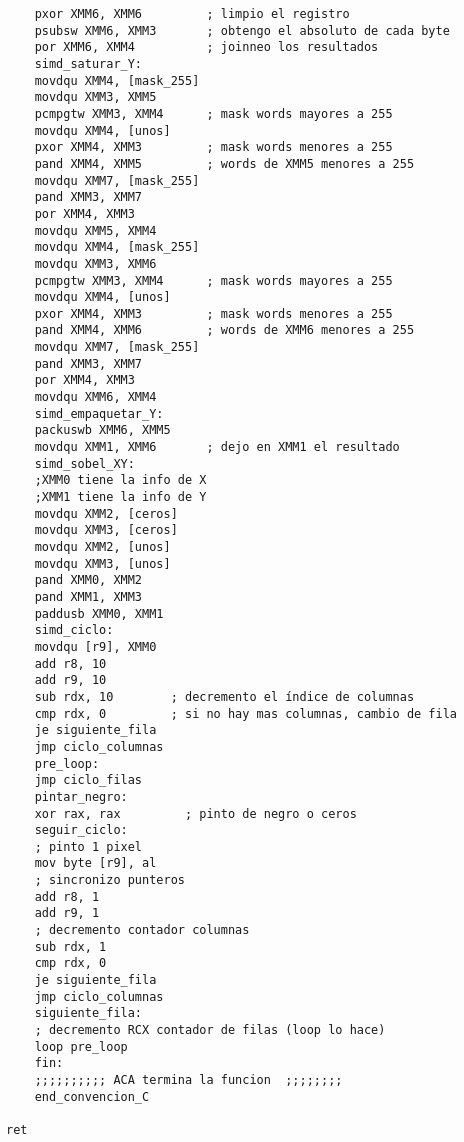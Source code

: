 \begin{verbatim}
    pxor XMM6, XMM6         ; limpio el registro
    psubsw XMM6, XMM3       ; obtengo el absoluto de cada byte
    por XMM6, XMM4          ; joinneo los resultados
    simd_saturar_Y:
    movdqu XMM4, [mask_255]
    movdqu XMM3, XMM5
    pcmpgtw XMM3, XMM4      ; mask words mayores a 255
    movdqu XMM4, [unos]
    pxor XMM4, XMM3         ; mask words menores a 255
    pand XMM4, XMM5         ; words de XMM5 menores a 255
    movdqu XMM7, [mask_255]
    pand XMM3, XMM7
    por XMM4, XMM3
    movdqu XMM5, XMM4
    movdqu XMM4, [mask_255]
    movdqu XMM3, XMM6
    pcmpgtw XMM3, XMM4      ; mask words mayores a 255
    movdqu XMM4, [unos]
    pxor XMM4, XMM3         ; mask words menores a 255
    pand XMM4, XMM6         ; words de XMM6 menores a 255
    movdqu XMM7, [mask_255]
    pand XMM3, XMM7
    por XMM4, XMM3
    movdqu XMM6, XMM4
    simd_empaquetar_Y:
    packuswb XMM6, XMM5
    movdqu XMM1, XMM6       ; dejo en XMM1 el resultado
    simd_sobel_XY:
    ;XMM0 tiene la info de X
    ;XMM1 tiene la info de Y
    movdqu XMM2, [ceros]
    movdqu XMM3, [ceros]
    movdqu XMM2, [unos]
    movdqu XMM3, [unos]
    pand XMM0, XMM2
    pand XMM1, XMM3
    paddusb XMM0, XMM1
    simd_ciclo:
    movdqu [r9], XMM0
    add r8, 10
    add r9, 10
    sub rdx, 10        ; decremento el índice de columnas
    cmp rdx, 0         ; si no hay mas columnas, cambio de fila
    je siguiente_fila
    jmp ciclo_columnas
    pre_loop:	
    jmp ciclo_filas
    pintar_negro:
    xor rax, rax         ; pinto de negro o ceros
    seguir_ciclo:
    ; pinto 1 pixel
    mov byte [r9], al
    ; sincronizo punteros
    add r8, 1
    add r9, 1
    ; decremento contador columnas
    sub rdx, 1
    cmp rdx, 0
    je siguiente_fila
    jmp ciclo_columnas
    siguiente_fila:
    ; decremento RCX contador de filas (loop lo hace)
    loop pre_loop
    fin:
    ;;;;;;;;;; ACA termina la funcion  ;;;;;;;;
    end_convencion_C

ret

\end{verbatim}

